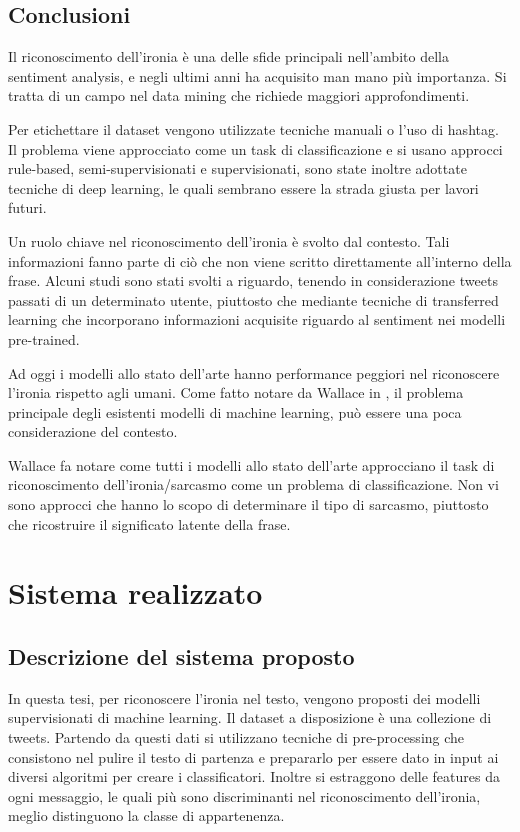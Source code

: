 \documentclass[oneside]{book}
\begin{document}
\section{Conclusioni}
Il riconoscimento dell'ironia è una delle sfide principali nell'ambito della sentiment analysis, e negli ultimi anni ha acquisito man mano più importanza. Si tratta di un campo nel data mining che richiede maggiori approfondimenti.

Per etichettare il dataset vengono utilizzate tecniche manuali o l'uso di hashtag. Il problema viene approcciato come un task di classificazione e si usano approcci rule-based, semi-supervisionati e supervisionati, sono state inoltre adottate tecniche di deep learning, le quali sembrano essere la strada giusta per lavori futuri.

Un ruolo chiave nel riconoscimento dell'ironia è svolto dal contesto. Tali informazioni fanno parte di ciò che non viene scritto direttamente all'interno della frase. Alcuni studi sono stati svolti a riguardo, tenendo in considerazione tweets passati di un determinato utente, piuttosto che mediante tecniche di transferred learning che incorporano informazioni acquisite riguardo al sentiment nei modelli pre-trained.

Ad oggi i modelli allo stato dell'arte hanno performance peggiori nel riconoscere l'ironia rispetto agli umani. Come fatto notare da Wallace in \cite{survey4}, il problema principale degli esistenti modelli di machine learning, può essere una poca considerazione del contesto.

Wallace fa notare come tutti i modelli allo stato dell'arte approcciano il task di riconoscimento dell'ironia/sarcasmo come un problema di classificazione. Non vi sono approcci che hanno lo scopo di determinare il tipo di sarcasmo, piuttosto che ricostruire il significato latente della frase.

\chapter{Sistema realizzato}

\section{Descrizione del sistema proposto}
In questa tesi, per riconoscere l'ironia nel testo, vengono proposti dei modelli supervisionati di machine learning.
Il dataset a disposizione è una collezione di tweets. Partendo da questi dati si utilizzano tecniche di pre-processing che consistono nel pulire il testo di partenza e prepararlo per essere dato in input ai diversi algoritmi per creare i classificatori. Inoltre si estraggono delle features da ogni messaggio, le quali più sono discriminanti nel riconoscimento dell'ironia, meglio distinguono la classe di appartenenza.
\end{document}
